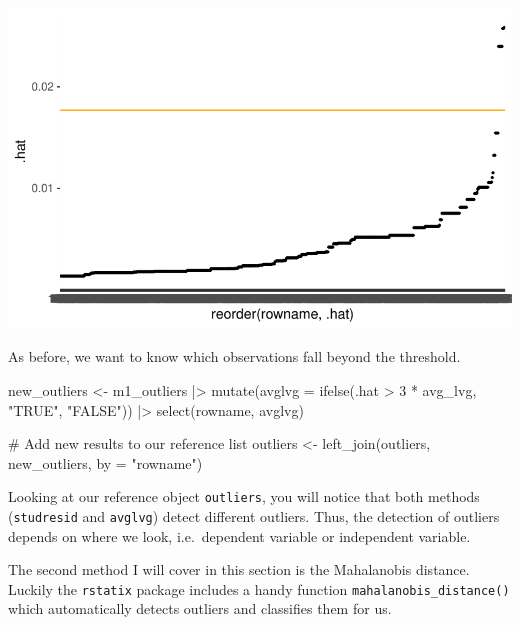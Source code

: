 \documentclass[
  letterpaper,
  DIV=11,
  numbers=noendperiod]{scrreprt}
\newenvironment{Shaded}{\begin{snugshade}}{\end{snugshade}}
\newcommand{\AttributeTok}[1]{\textcolor[rgb]{0.40,0.45,0.13}{#1}}
\newcommand{\CommentTok}[1]{\textcolor[rgb]{0.37,0.37,0.37}{#1}}
\newcommand{\DecValTok}[1]{\textcolor[rgb]{0.68,0.00,0.00}{#1}}
\newcommand{\FunctionTok}[1]{\textcolor[rgb]{0.28,0.35,0.67}{#1}}
\newcommand{\NormalTok}[1]{\textcolor[rgb]{0.00,0.23,0.31}{#1}}
\newcommand{\OtherTok}[1]{\textcolor[rgb]{0.00,0.23,0.31}{#1}}
\newcommand{\SpecialCharTok}[1]{\textcolor[rgb]{0.37,0.37,0.37}{#1}}
\newcommand{\StringTok}[1]{\textcolor[rgb]{0.13,0.47,0.30}{#1}}
\begin{document}
\includegraphics{13_regressions_files/figure-latex/avg-lvg-plot-1.pdf}

As before, we want to know which observations fall beyond the threshold.

\begin{Shaded}
\begin{Highlighting}[]
\NormalTok{new\_outliers }\OtherTok{\textless{}{-}}
\NormalTok{  m1\_outliers }\SpecialCharTok{|\textgreater{}}
  \FunctionTok{mutate}\NormalTok{(}\AttributeTok{avglvg =} \FunctionTok{ifelse}\NormalTok{(.hat }\SpecialCharTok{\textgreater{}} \DecValTok{3} \SpecialCharTok{*}\NormalTok{ avg\_lvg, }\StringTok{"TRUE"}\NormalTok{, }\StringTok{"FALSE"}\NormalTok{)) }\SpecialCharTok{|\textgreater{}}
  \FunctionTok{select}\NormalTok{(rowname, avglvg)}

\CommentTok{\# Add new results to our reference list}
\NormalTok{outliers }\OtherTok{\textless{}{-}} \FunctionTok{left\_join}\NormalTok{(outliers, new\_outliers, }\AttributeTok{by =} \StringTok{"rowname"}\NormalTok{)}
\end{Highlighting}
\end{Shaded}

Looking at our reference object \texttt{outliers}, you will notice that
both methods (\texttt{studresid} and \texttt{avglvg}) detect different
outliers. Thus, the detection of outliers depends on where we look,
i.e.~dependent variable or independent variable.

The second method I will cover in this section is the Mahalanobis
distance. Luckily the \texttt{rstatix} package includes a handy function
\texttt{mahalanobis\_distance()} which automatically detects outliers
and classifies them for us.
\end{document}
